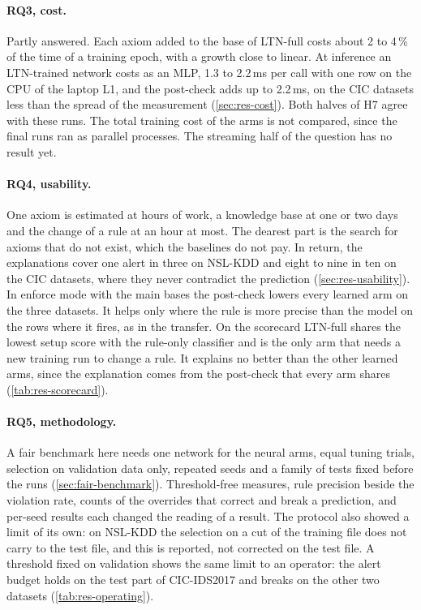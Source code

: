 \paragraph{RQ3, cost.}
Partly answered. Each axiom added to the base of LTN-full costs about 2 to 4\,\% of the time of a
training epoch, with a growth close to linear. At inference an LTN-trained network costs as an MLP,
1.3 to 2.2\,ms per call with one row on the CPU of the laptop L1, and the post-check adds up to
2.2\,ms, on the CIC datasets less than the spread of the measurement (\cref{sec:res-cost}). Both halves of H7 agree with these runs. The total training cost of
the arms is not compared, since the final runs ran as parallel processes. The streaming half of the question
has no result yet.

\paragraph{RQ4, usability.}
One axiom is estimated at hours of work, a knowledge base at one or two days and the change of a rule
at an hour at most. The dearest part is the search for axioms that do not exist, which the
baselines do not pay. In return, the explanations cover one alert in three on NSL-KDD and eight to
nine in ten on the CIC datasets, where they never contradict the prediction
(\cref{sec:res-usability}). In enforce mode with the main bases the post-check lowers every learned
arm on the three datasets. It helps only where the rule is more precise than the model on the rows
where it fires, as in the transfer. On the scorecard LTN-full shares the lowest setup
score with the rule-only classifier and is the only arm that needs a new training run to change a
rule. It explains no better than the other learned arms, since the explanation comes from the post-check that every arm shares (\cref{tab:res-scorecard}).

\paragraph{RQ5, methodology.}
A fair benchmark here needs one network for the neural arms, equal tuning trials, selection on
validation data only, repeated seeds and a family of tests fixed before the runs
(\cref{sec:fair-benchmark}). Threshold-free measures, rule precision beside the violation rate,
counts of the overrides that correct and break a prediction, and per-seed results each changed the
reading of a result. The protocol also showed a limit of its own: on NSL-KDD the selection on a cut
of the training file does not carry to the test file, and this is reported, not corrected on the
test file. A threshold fixed on validation shows the same limit to an operator: the alert budget
holds on the test part of CIC-IDS2017 and breaks on the other two datasets
(\cref{tab:res-operating}).

